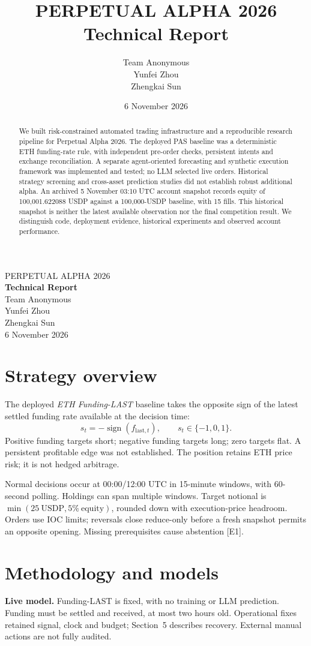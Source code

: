 \documentclass[a4paper]{article}
\title{{\large PERPETUAL ALPHA 2026}\\[3mm]Technical Report}
\author{Team Anonymous\\[1mm]\small Yunfei Zhou\\\small Zhengkai Sun}
\date{6 November 2026}
\begin{document}
\begin{center}
{\large PERPETUAL ALPHA 2026}\\[1mm]
{\Large\bfseries Technical Report}\\[2mm]
Team Anonymous\\[1mm]
\small Yunfei Zhou\\
\small Zhengkai Sun\\[1mm]
6 November 2026
\end{center}
\begin{abstract}
We built risk-constrained automated trading infrastructure and a reproducible research pipeline for Perpetual Alpha 2026. The deployed PAS baseline was a deterministic ETH funding-rate rule, with independent pre-order checks, persistent intents and exchange reconciliation. A separate agent-oriented forecasting and synthetic execution framework was implemented and tested; no LLM selected live orders. Historical strategy screening and cross-asset prediction studies did not establish robust additional alpha. An archived 5 November 03:10 UTC account snapshot records equity of 100,001.622088 USDP against a 100,000-USDP baseline, with 15 fills. This historical snapshot is neither the latest available observation nor the final competition result. We distinguish code, deployment evidence, historical experiments and observed account performance.
\end{abstract}

\section{Strategy overview}
The deployed \emph{ETH Funding-LAST} baseline takes the opposite sign of the latest settled funding rate available at the decision time:
\[
 s_t=-\operatorname{sign}(f_{\mathrm{last},t}),\qquad s_t\in\{-1,0,1\}.
\]
Positive funding targets short; negative funding targets long; zero targets flat. A persistent profitable edge was not established. The position retains ETH price risk; it is not hedged arbitrage.

Normal decisions occur at 00:00/12:00 UTC in 15-minute windows, with 60-second polling. Holdings can span multiple windows. Target notional is $\min(25\ \mathrm{USDP},5\%\ \mathrm{equity})$, rounded down with execution-price headroom. Orders use IOC limits; reversals close reduce-only before a fresh snapshot permits an opposite opening. Missing prerequisites cause abstention [E1].

\section{Methodology and models}
\textbf{Live model.} Funding-LAST is fixed, with no training or LLM prediction. Funding must be settled and received, at most two hours old. Operational fixes retained signal, clock and budget; Section~5 describes recovery. External manual actions are not fully audited.
\end{document}
